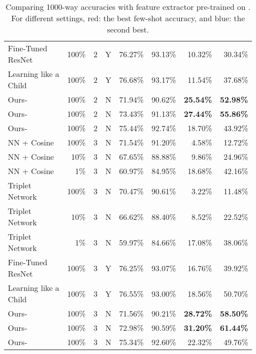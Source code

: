 \begin{table*}
\begin{tabular}{lrccll:rr}
        Fine-Tuned ResNet~\cite{DBLP:conf/cvpr/HeZRS16} & 100\% & 2 & Y & 76.27\% & 93.13\% & 10.32\% & 30.34\% \\
        Learning like a Child~\cite{mao2015learning} & 100\% & 2 & Y & 76.68\% & 93.17\% & 11.54\% & 37.68\% \\
        \hdashline
        Ours-         & 100\% & 2 & N & 71.94\% & 90.62\% & {\bf\color{blue}25.54\%} & {\bf\color{blue}52.98\%} \\
        Ours-         & 100\% & 2 & N & 73.43\% & 91.13\% & {\bf\color{red}27.44\%} & {\bf\color{red}55.86\%} \\
        Ours-      & 100\% & 2 & N & 75.44\% & 92.74\% & 18.70\% & 43.92\% \\
        \midrule
        NN + Cosine  & 100\% & 3 & N & 71.54\% & 91.20\% & 4.58\% & 12.72\% \\
        NN + Cosine  &  10\% & 3 & N & 67.65\% & 88.88\% & 9.86\% & 24.96\% \\
        NN + Cosine  &   1\% & 3 & N & 60.97\% & 84.95\% & 18.68\% & 42.16\% \\
        Triplet Network~\cite{siamese,lin2017transfer}  & 100\% & 3 & N & 70.47\% & 90.61\% & 3.22\% & 11.48\% \\
        Triplet Network~\cite{siamese,lin2017transfer}  &  10\% & 3 & N & 66.62\% & 88.40\% & 8.52\% & 22.52\% \\
        Triplet Network~\cite{siamese,lin2017transfer}  &   1\% & 3 & N & 59.97\% & 84.66\% & 17.08\% & 38.06\% \\
        Fine-Tuned ResNet~\cite{DBLP:conf/cvpr/HeZRS16} & 100\% & 3 & Y & 76.25\% & 93.07\% & 16.76\% & 39.92\% \\
        Learning like a Child~\cite{mao2015learning} & 100\% & 3 & Y & 76.55\% & 93.00\% & 18.56\% & 50.70\% \\
        \hdashline
        Ours-         & 100\% & 3 & N & 71.56\% & 90.21\% & {\bf\color{blue}28.72\%} & {\bf\color{blue}58.50\%} \\
        Ours-         & 100\% & 3 & N & 72.98\% & 90.59\% & {\bf\color{red}31.20\%} & {\bf\color{red}61.44\%} \\
        Ours-      & 100\% & 3 & N & 75.34\% & 92.60\% & 22.32\% & 49.76\% \\
        \bottomrule
    \end{tabular}
    \caption{Comparing 1000-way accuracies with feature extractor  pre-trained on . For different  settings, red: the best few-shot accuracy, and blue: the second best.}
    \label{tab:real1}
\end{table*}



